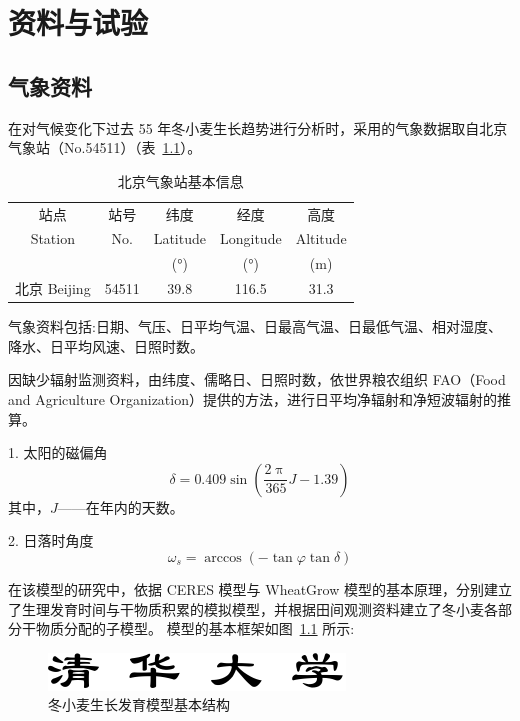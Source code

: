 \documentclass[degree=bachelor]{thuthesis}
\begin{document}
\chapter{资料与试验}

\section{气象资料}

在对气候变化下过去 55 年冬小麦生长趋势进行分析时，采用的气象数据取自北京气象站（No.54511）（表~\ref{tab:beijing}）。

\begin{table}[htb]
  \centering
  \caption{北京气象站基本信息}
  \label{tab:beijing}
  \begin{tabular}{ccccc}
    \toprule
    站点 & 站号 & 纬度 & 经度 & 高度 \\
    Station & No. & Latitude & Longitude & Altitude \\
    && (°) & (°) & (m) \\
    \midrule
    北京 Beijing & 54511 & 39.8 & 116.5 & 31.3 \\
    \bottomrule
  \end{tabular}
\end{table}

气象资料包括:日期、气压、日平均气温、日最高气温、日最低气温、相对湿度、降水、日平均风速、日照时数。

因缺少辐射监测资料，由纬度、儒略日、日照时数，依世界粮农组织 FAO（Food and Agriculture Organization）提供的方法，进行日平均净辐射和净短波辐射的推算。

1. 太阳的磁偏角
\begin{equation}
  \delta = 0.409 \sin \left( \frac{2\uppi}{365} J - 1.39 \right)
\end{equation}
其中，$J$——在年内的天数。

2. 日落时角度
\begin{equation}
  \omega_s =\arccos\left( -\tan\varphi \tan\delta \right)
\end{equation}

\newpage

在该模型的研究中，依据 CERES 模型与 WheatGrow 模型的基本原理，分别建立了生理发育时间与干物质积累的模拟模型，并根据田间观测资料建立了冬小麦各部分干物质分配的子模型。
模型的基本框架如图~\ref{fig:winter} 所示:

\begin{figure}[htb]
  \centering
  \includegraphics{tsinghua-name-bachelor.pdf}
  \caption{冬小麦生长发育模型基本结构}
  \label{fig:winter}
\end{figure}
\end{document}
